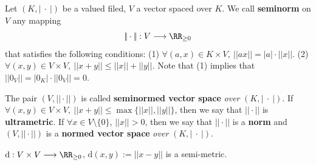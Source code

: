\begin{definitionenv}
    Let $(K,\left|\ \cdot \ \right|)$ be a valued filed, $V$ a vector spaced over $K$. We call \textbf{seminorm} on $V$ any mapping 
    $$|\!| \cdot |\!|:V\longrightarrow \RR_{\geq 0}$$ 
    that satisfies the following conditions:
    \newline
    (1) $\forall (a,x)\in K\times V,\ |\!|ax|\!|=|a|\cdot|\!|x|\!|$.
    \newline
    (2) $\forall (x,y)\in V\times V,\ |\!|x+y|\!|\le |\!|x|\!|+|\!|y|\!|.$
    \newline
    Note that (1) implies that $|\!|0_V|\!|=|0_K|\cdot|\!|0_V|\!|=0$.

    The pair $(V,|\!| \cdot |\!|)$ is called \textbf{seminormed vector space} \textit{over} $(K,\left|\ \cdot\ \right|)$. If $\forall(x,y)\in V\times V,\ |\!|x+y|\!|\le \max\{|\!|x|\!|,|\!|y|\!|\}$, then we say that $|\!|\cdot|\!|$ is \textbf{ultrametric}. If $\forall x\in V\setminus\{0\}$, $|\!|x|\!|>0$, then we say that $|\!| \cdot|\!|$ is a \textbf{norm} and $(V,|\!| \cdot |\!|)$ is a \textbf{normed vector space} \textit{over} $(K,\left|\ \cdot\ \right|)$.
\end{definitionenv}
\begin{exampleenv}
    $\mathrm{d}:V\times V\longrightarrow \RR_{\ge 0}$, $\mathrm{d}(x,y):=|\!|x-y|\!|$ is a semi-metric. 
\end{exampleenv}

